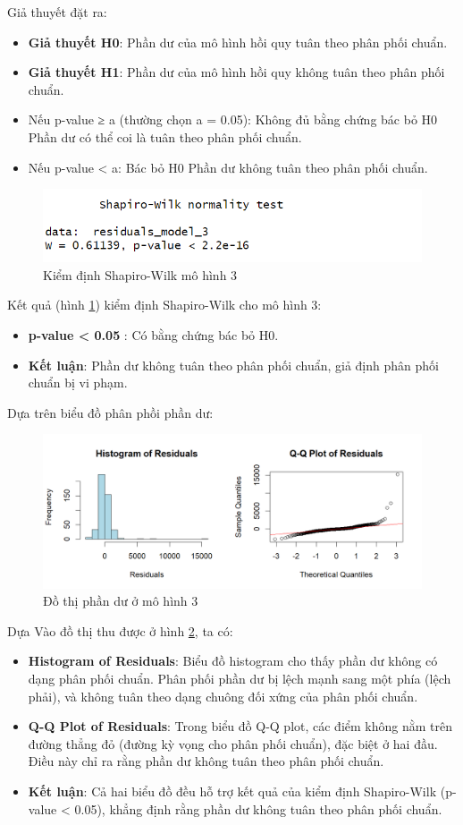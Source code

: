 Giả thuyết đặt ra:
\begin{itemize}
  \item\textbf{Giả thuyết H0}: Phần dư của mô hình hồi quy tuân theo phân phối chuẩn.
  \item\textbf{Giả thuyết H1}: Phần dư của mô hình hồi quy không tuân theo phân phối chuẩn.
  \item Nếu p-value ≥ a (thường chọn a = 0.05): Không đủ bằng chứng bác bỏ H0 \rightarrow Phần dư có thể coi là tuân theo phân phối chuẩn.
  \item Nếu p-value < a: Bác bỏ H0 \rightarrow Phần dư không tuân theo phân phối chuẩn.
\end{itemize}

\begin{figure}[H]
  \centering
  \includegraphics[width=0.7\linewidth]{graphics/5.5.6.png}
  \caption{Kiểm định Shapiro-Wilk mô hình 3 }
  \label{kd1}
\end{figure}

Kết quả (hình \ref{kd1}) kiểm định Shapiro-Wilk cho mô hình 3:
\begin{itemize}
  \item\textbf{p-value < 0.05 }: Có bằng chứng bác bỏ H0.
  \item\textbf{Kết luận}: Phần dư không tuân theo phân phối chuẩn, giả định phân phối chuẩn bị vi phạm.
\end{itemize}

Dựa trên biểu đồ phân phồi phần dư:
\begin{figure}[H]
  \centering
  \includegraphics[width=0.7\linewidth]{graphics/5.5.9.png}
  \caption{Đồ thị phần dư ở mô hình 3}
  \label{kd2}
\end{figure}
Dựa Vào đồ thị thu được ở hình \ref{kd2}, ta có: 

\begin{itemize}
  \item\textbf{Histogram of Residuals}: Biểu đồ histogram cho thấy phần dư không có dạng phân phối chuẩn. Phân phối phần dư bị lệch mạnh sang một phía (lệch phải), và không tuân theo dạng chuông đối xứng của phân phối chuẩn.
  \item\textbf{Q-Q Plot of Residuals}: Trong biểu đồ Q-Q plot, các điểm không nằm trên đường thẳng đỏ (đường kỳ vọng cho phân phối chuẩn), đặc biệt ở hai đầu. Điều này chỉ ra rằng phần dư không tuân theo phân phối chuẩn.
  \item\textbf{Kết luận}: Cả hai biểu đồ đều hỗ trợ kết quả của kiểm định Shapiro-Wilk (p-value < 0.05), khẳng định rằng phần dư không tuân theo phân phối chuẩn.
\end{itemize}


